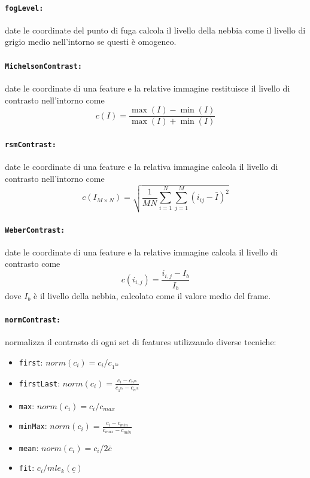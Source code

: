 \documentclass[12pt]{report}
\begin{document}
\paragraph*{\verb_fogLevel:_} date le coordinate del punto di fuga calcola il livello della nebbia come il livello di grigio medio nell'intorno se questi \`e omogeneo.

\paragraph*{\verb_MichelsonContrast:_} date le coordinate di una feature e la relative immagine restituisce il livello di contrasto nell'intorno come $$c\left(I\right) = \frac{\max(I)-\min(I)}{\max(I)+\min(I)}$$

\paragraph*{\verb_rsmContrast:_} date le coordinate di una feature e la relativa immagine calcola il livello di contrasto nell'intorno come $$ c\left(I_{M\times N}\right) = \sqrt{\frac{1}{MN}\sum_{i=1}^N\sum_{j=1}^M(i_{ij}-\bar{I})^2} $$

\paragraph*{\verb_WeberContrast:_} date le coordinate di una feature e la relative immagine calcola il livello di contrasto come $$c\left(i_{i,j}\right)= \frac{i_{i,j}-I_b}{I_b}$$ dove $I_b$ \`e il livello della nebbia, calcolato come il valore medio del frame.

\paragraph*{\verb_normContrast:_} normalizza il contrasto di ogni set di features utilizzando diverse tecniche:
\begin{itemize}
	\item \verb|first|: $ norm\left(c_i\right) = c_i/c_{1^{th}} $
	\item \verb|firstLast|: $ norm\left(c_i\right) = \frac{c_i-c_{n^{th}}}{c_{1^{th}} - c_{n^{th}}} $
	\item \verb|max|: $ norm\left(c_i\right) = c_i/c_{max} $
	\item \verb|minMax|: $ norm\left(c_i\right) = \frac{c_i-c_{min}}{c_{max} - c_{min}} $
	\item \verb|mean|: $ norm(c_i) = c_i/2\bar{c} $
	\item \verb|fit|: $ c_i / mle_{k}(\underline{c}) $
\end{itemize}
\end{document}
